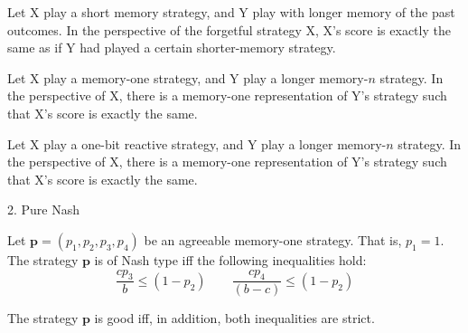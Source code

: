 \documentclass{beamer}
\begin{document}
\begin{frame}
    \begin{center}
    Let X play a short memory strategy, and Y play with longer memory of the
    past outcomes. In the perspective of the forgetful strategy X, X's score
    is exactly the same as if Y had played a certain shorter-memory strategy.
    \end{center}
\end{frame}

\begin{frame}
    \begin{center}
    Let X play a memory-one strategy, and Y play a longer memory-\(n\) strategy.
    In the perspective of X, there is a memory-one representation
    of Y's strategy such that X's score is exactly the same.
    \end{center}
\end{frame}

\begin{frame}
    \begin{center}
    Let X play a one-bit reactive strategy, and Y play a longer memory-\(n\) strategy.
    In the perspective of X, there is a memory-one representation
    of Y's strategy such that X's score is exactly the same.
    \end{center}
\end{frame}


\begin{frame}
    \begin{center}
        \Large 2. Pure Nash
    \end{center}
\end{frame}

\begin{frame}
    \footnotesize{
    \begin{theorem}
        Let \(\mathbf{p} = (p_1, p_2, p_3, p_4)\) be an agreeable memory-one strategy. That is, \(p_1 = 1\).
        The strategy \(\mathbf{p}\) is of Nash type iff the following inequalities hold:
        \begin{equation*}
            \frac{c p_3}{b} \leq (1 - p_2)  \qquad \frac{c p_4}{(b - c)} \leq (1 - p_2)
        \end{equation*}
    
        The strategy \(\mathbf{p}\) is good iff, in addition, both inequalities are strict.
    \end{theorem}}
\end{frame}
\end{document}

